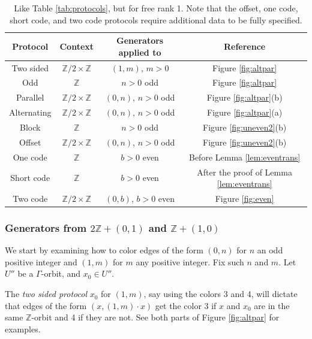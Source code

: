 \documentclass[12pt]{article}
\newcommand{\0}{\varnothing}
\newcommand{\Z}{\mathbb{Z}}
\begin{document}
\begin{table}[]
    \centering
    \begin{tabular}{| c | c | c | c |}
        \hline 
        Protocol & Context & Generators applied to & Reference \\
        \hline
        \hline
        Two sided & $\Z/2 \times \Z$ & $(1,m)$, $m > 0$ & Figure \ref{fig:altpar} \\
        \hline
        Odd & $\Z$ & $n > 0$ odd & Figure \ref{fig:altpar} \\
        \hline
        Parallel & $\Z/2 \times \Z$ & $(0,n)$, $n >0$ odd & Figure \ref{fig:altpar}(b)\\
        \hline
        Alternating & $\Z/2 \times \Z$ & $(0,n)$, $n > 0$ odd & Figure \ref{fig:altpar}(a) \\
        \hline
        Block & $\Z$ & $n > 0$ odd & Figure \ref{fig:uneven2}(b) \\
        \hline
        Offset & $\Z/2 \times \Z$ & $(0,n)$, $n > 0$ odd & Figure \ref{fig:uneven2}(b)\\
        \hline
        One code & $\Z$ & $b > 0$ even &  Before Lemma \ref{lem:eventrans}\\
        \hline
        Short code & $\Z$ & $b > 0$ even & After the proof of Lemma \ref{lem:eventrans} \\
        \hline
        Two code & $\Z/2 \times \Z$ & $(0,b)$, $b > 0$ even & Figure \ref{fig:even}\\
        \hline
        
    \end{tabular}
    \caption{Like Table \ref{tab:protocols}, but for free rank 1. Note that the offset, one code, short code, and two code protocols require additional data to be fully specified.}
    \label{tab:1protocols}
\end{table}

\subsubsection{Generators from $2\Z + (0,1)$ and $\Z + (1,0)$}\label{subsubsec:rank1base}

We start by examining how to color edges of the form $(0,n)$ for $n$ an odd positive integer and $(1,m)$ for $m$ any positive integer. Fix such $n$ and $m$. Let $U''$ be a $\Gamma$-orbit, and $x_0 \in U''$. 

The \textit{two sided protocol} $x_0$ for $(1,m)$, say using the colors 3 and 4, will dictate that edges of the form $(x,(1,m) \cdot x)$ get the color 3 if $x$ and $x_0$ are in the same $\Z$-orbit and 4 if they are not. See both parts of Figure \ref{fig:altpar} for examples.
\end{document}
